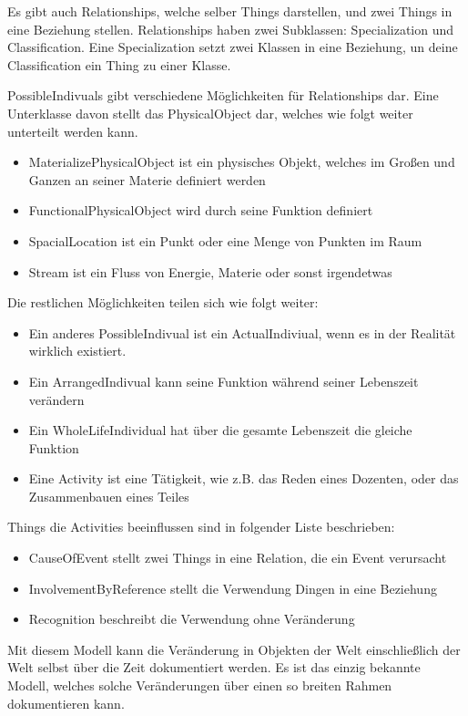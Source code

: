 Es gibt auch Relationships, welche selber Things darstellen, und zwei Things in eine Beziehung stellen. Relationships haben zwei Subklassen: Specialization und Classification. Eine Specialization setzt zwei Klassen in eine Beziehung, un deine Classification ein Thing zu einer Klasse.

PossibleIndivuals gibt verschiedene Möglichkeiten für Relationships dar. Eine Unterklasse davon stellt das PhysicalObject dar, welches wie folgt weiter unterteilt werden kann.

\begin{itemize}
\item MaterializePhysicalObject ist ein physisches Objekt, welches im Großen und Ganzen an seiner Materie definiert werden
\item FunctionalPhysicalObject wird durch seine Funktion definiert
\item SpacialLocation ist ein Punkt oder eine Menge von Punkten im Raum
\item Stream ist ein Fluss von Energie, Materie oder sonst irgendetwas
\end{itemize}

Die restlichen Möglichkeiten teilen sich wie folgt weiter:

\begin{itemize}
\item Ein anderes PossibleIndivual ist ein ActualIndiviual, wenn es in der Realität wirklich existiert.
\item Ein ArrangedIndivual kann seine Funktion während seiner Lebenszeit verändern
\item Ein WholeLifeIndividual hat über die gesamte Lebenszeit die gleiche Funktion
\item Eine Activity ist eine Tätigkeit, wie z.B. das Reden eines Dozenten, oder das Zusammenbauen eines Teiles
\end{itemize}

Things die Activities beeinflussen sind in folgender Liste beschrieben:

\begin{itemize}
\item CauseOfEvent stellt zwei Things in eine Relation, die ein Event verursacht
\item InvolvementByReference stellt die Verwendung Dingen in eine Beziehung
\item Recognition beschreibt die Verwendung ohne Veränderung
\end{itemize}

Mit diesem Modell kann die Veränderung in Objekten der Welt einschließlich der Welt selbst über die Zeit dokumentiert werden. Es ist das einzig bekannte Modell, welches solche Veränderungen über einen so breiten Rahmen dokumentieren kann.

